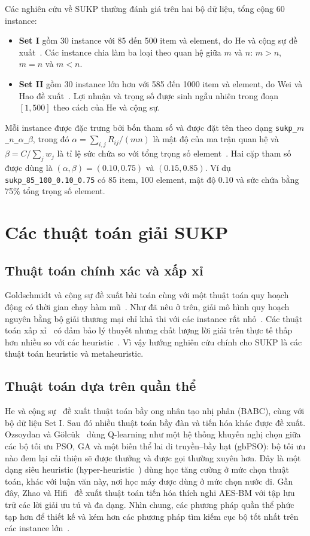 Các nghiên cứu về SUKP thường đánh giá trên hai bộ dữ liệu, tổng cộng 60 instance:
\begin{itemize}
  \item \textbf{Set I} gồm 30 instance với 85 đến 500 item và element, do He và cộng sự đề xuất~\cite{He2018}. Các instance chia làm ba loại theo quan hệ giữa $m$ và $n$: $m>n$, $m=n$ và $m<n$.
  \item \textbf{Set II} gồm 30 instance lớn hơn với 585 đến 1000 item và element, do Wei và Hao đề xuất~\cite{Wei2021}. Lợi nhuận và trọng số được sinh ngẫu nhiên trong đoạn $[1,500]$ theo cách của He và cộng sự.
\end{itemize}
Mỗi instance được đặc trưng bởi bốn tham số và được đặt tên theo dạng \texttt{sukp\_$m$\_$n$\_$\alpha$\_$\beta$}, trong đó $\alpha=\sum_{i,j}R_{ij}/(mn)$ là mật độ của ma trận quan hệ và $\beta=C/\sum_j w_j$ là tỉ lệ sức chứa so với tổng trọng số element~\cite{Zhu2022}. Hai cặp tham số được dùng là $(\alpha,\beta)=(0.10,0.75)$ và $(0.15,0.85)$. Ví dụ \texttt{sukp\_85\_100\_0.10\_0.75} có 85 item, 100 element, mật độ 0.10 và sức chứa bằng 75\% tổng trọng số element.

\section{Các thuật toán giải SUKP}\label{sec:sukp_algos}

\subsection{Thuật toán chính xác và xấp xỉ}

Goldschmidt và cộng sự đề xuất bài toán cùng với một thuật toán quy hoạch động có thời gian chạy hàm mũ~\cite{Goldschmidt1994}. Như đã nêu ở trên, giải mô hình quy hoạch nguyên bằng bộ giải thương mại chỉ khả thi với các instance rất nhỏ~\cite{Wei2019}. Các thuật toán xấp xỉ~\cite{Arulselvan2014} có đảm bảo lý thuyết nhưng chất lượng lời giải trên thực tế thấp hơn nhiều so với các heuristic~\cite{Zhu2022}. Vì vậy hướng nghiên cứu chính cho SUKP là các thuật toán heuristic và metaheuristic.

\subsection{Thuật toán dựa trên quần thể}

He và cộng sự~\cite{He2018} đề xuất thuật toán bầy ong nhân tạo nhị phân (BABC), cùng với bộ dữ liệu Set I. Sau đó nhiều thuật toán bầy đàn và tiến hóa khác được đề xuất. Ozsoydan và Gölcük~\cite{Ozsoydan2023} dùng Q-learning như một hệ thống khuyến nghị chọn giữa các bộ tối ưu PSO, GA và một biến thể lai di truyền--bầy hạt (gbPSO): bộ tối ưu nào đem lại cải thiện sẽ được thưởng và được gọi thường xuyên hơn. Đây là một dạng siêu heuristic (hyper-heuristic~\cite{Burke2013}) dùng học tăng cường ở mức chọn thuật toán, khác với luận văn này, nơi học máy được dùng ở mức chọn nước đi. Gần đây, Zhao và Hifi~\cite{Zhao2024} đề xuất thuật toán tiến hóa thích nghi AES-BM với tập lưu trữ các lời giải ưu tú và đa dạng. Nhìn chung, các phương pháp quần thể phức tạp hơn để thiết kế và kém hơn các phương pháp tìm kiếm cục bộ tốt nhất trên các instance lớn~\cite{Zhu2022}.

